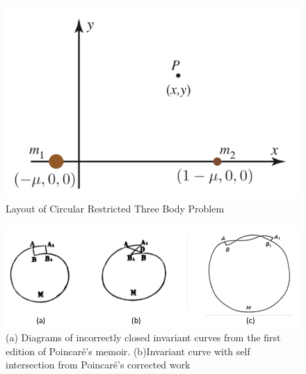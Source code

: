 \documentclass[12pt]{article} %
\begin{document}
\begin{figure}[H]
\centering
\includegraphics[scale=0.4]{CR3BP.png}\nonumber
\caption{Layout of Circular Restricted Three Body Problem \cite{KoonLoMarsdenRoss2011}}
\label{fig:CR3BP}
\end{figure}
\begin{figure}[H]
\centering
\includegraphics[scale=0.4]{curveIntersection1.png}\nonumber
\caption{(a) Diagrams of incorrectly closed invariant curves from the first edition of Poincaré's memoir. (b)Invariant curve with self intersection from Poincaré's corrected work \cite{BarrowGreen1997}}
\label{fig:curveIntersection1}
\end{figure}

\end{document}
